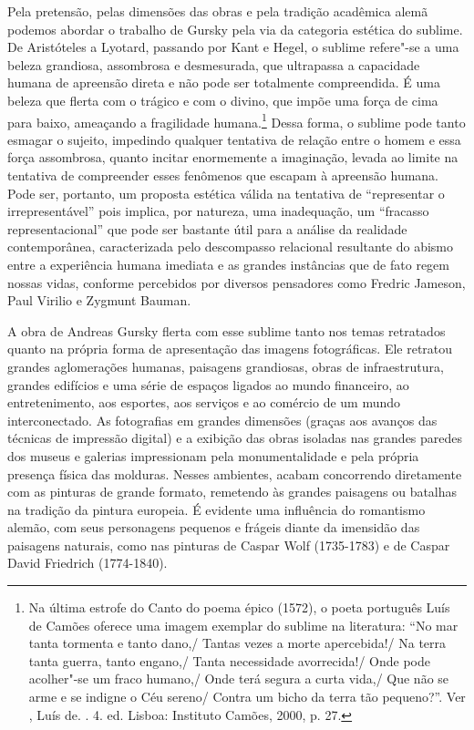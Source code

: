 Pela pretensão, pelas dimensões das obras e pela tradição acadêmica
alemã podemos abordar o trabalho de Gursky pela via da categoria
estética do sublime. De Aristóteles a Lyotard, passando por Kant e
Hegel, o sublime refere"-se a uma beleza grandiosa, assombrosa e
desmesurada, que ultrapassa a capacidade humana de apreensão direta e
não pode ser totalmente compreendida. É uma beleza que flerta com o
trágico e com o divino, que impõe uma força de cima para baixo,
ameaçando a fragilidade humana.\footnote{Na última estrofe do Canto  do
  poema épico {} (1572), o poeta português Luís de Camões
  oferece uma imagem exemplar do sublime na literatura: ``No mar tanta
  tormenta e tanto dano,/ Tantas vezes a morte apercebida!/ Na terra
  tanta guerra, tanto engano,/ Tanta necessidade avorrecida!/ Onde pode
  acolher"-se um fraco humano,/ Onde terá segura a curta vida,/ Que não
  se arme e se indigne o Céu sereno/ Contra um bicho da terra tão
  pequeno?''. Ver , Luís de. {}. 4. ed. Lisboa: Instituto
  Camões, 2000, p. 27.} Dessa forma, o sublime pode tanto
esmagar o sujeito, impedindo qualquer tentativa de relação entre o homem
e essa força assombrosa, quanto incitar enormemente a imaginação, levada
ao limite na tentativa de compreender esses fenômenos que escapam à
apreensão humana. Pode ser, portanto, um proposta estética válida na
tentativa de ``representar o irrepresentável'' pois implica, por
natureza, uma inadequação, um ``fracasso representacional'' que pode ser
bastante útil para a análise da realidade contemporânea, caracterizada
pelo descompasso relacional resultante do abismo entre a experiência
humana imediata e as grandes instâncias que de fato regem nossas vidas,
conforme percebidos por diversos pensadores como Fredric Jameson, Paul Virilio e Zygmunt Bauman.

A obra de Andreas Gursky flerta com esse sublime tanto nos temas
retratados quanto na própria forma de apresentação das imagens
fotográficas. Ele retratou grandes aglomerações humanas, paisagens
grandiosas, obras de infraestrutura, grandes edifícios e uma série de
espaços ligados ao mundo financeiro, ao entretenimento, aos esportes,
aos serviços e ao comércio de um mundo interconectado. As fotografias em
grandes dimensões (graças aos avanços das técnicas de impressão digital)
e a exibição das obras isoladas nas grandes paredes dos museus e
galerias impressionam pela monumentalidade e pela própria presença
física das molduras. Nesses ambientes, acabam concorrendo diretamente
com as pinturas de grande formato, remetendo às grandes paisagens ou
batalhas na tradição da pintura europeia. É evidente uma influência do
romantismo alemão, com seus personagens pequenos e frágeis diante da
imensidão das paisagens naturais, como nas pinturas de Caspar Wolf
(1735-1783) e de Caspar David Friedrich (1774-1840).

